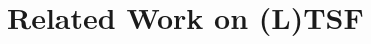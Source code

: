 \documentclass[a4paper,oneside,bibliography=totoc]{scrbook}
\begin{document}


\chapter{Related Work on (L)TSF}
\label{ch:related_work_LTSF}
\end{document}
